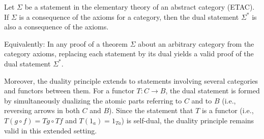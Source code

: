 Let $\Sigma$ be a statement in the elementary theory of an abstract category (ETAC). If $\Sigma$ is a consequence of the axioms for a category, then the dual statement $\Sigma^{*}$ is also a consequence of the axioms.

Equivalently: In any proof of a theorem $\Sigma$ about an arbitrary category from the category axioms, replacing each statement by its dual yields a valid proof of the dual statement $\Sigma^{*}$.

Moreover, the duality principle extends to statements involving several categories and functors between them. For a functor $T : C \rightarrow B$, the dual statement is formed by simultaneously dualizing the atomic parts referring to $C$ and to $B$ (i.e., reversing arrows in both $C$ and $B$). Since the statement that $T$ is a functor (i.e., $T(g \circ f) = Tg \circ Tf$ and $T(1_a) = 1_{Ta}$) is self-dual, the duality principle remains valid in this extended setting.
